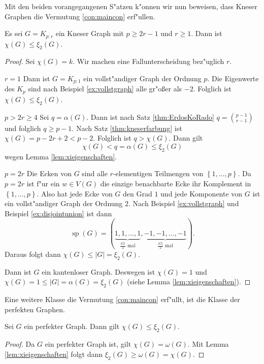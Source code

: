 Mit den beiden vorangegangenen S"atzen k"onnen wir nun beweisen, dass Kneser Graphen die Vermutung \ref{con:maincon} erf"ullen.
\begin{proposition}
  Es sei $G=K_{p:r}$ ein Kneser Graph mit $p\geq 2r-1$ und $r \geq 1$. Dann ist $\chi(G) \leq \xi_{2}(G)$. 
\end{proposition}
\begin{proof}
  Sei $\chi(G) = k$. Wir machen eine Fallunterscheidung bez"uglich $r$.

   {$r=1$} Dann ist $G=K_{p:1}$ ein vollst"andiger Graph der Ordnung $p$. Die Eigenwerte des $K_p$ sind nach Beispiel \ref{ex:vollstgraph} alle gr"o{\ss}er als $-2$. Folglich ist $\chi(G) \leq \xi_{2}(G)$. 

   {$p > 2r \geq 4 $} Sei $q = \alpha(G)$.  Dann ist nach Satz \ref{thm:ErdosKoRado} $ q = \binom{p-1}{r-1}$ und folglich $ q \geq p-1$. Nach Satz \ref{thm:kneserfarbung} ist $\chi(G) = p-2r+2 < p-2$. Folglich ist $q > \chi(G)$. 
  Dann gilt $$\chi(G) < q = \alpha(G) \leq \xi_{2}(G) $$ wegen Lemma \ref{lem:xieigenschaften}.

   {$ p = 2r $} Die Ecken von $G$ sind alle $r$-elementigen Teilmengen von $\left\{ 1,\dots,p \right\}$. Da $p=2r$ ist f"ur ein $w\in V(G)$ die einzige benachbarte Ecke ihr Komplement in $\left\{ 1,\dots,p \right\}$. 
  Also hat jede Ecke von $G$ den Grad $1$ und jede Komponente von $G$ ist ein vollst"andiger Graph der Ordnung $2$.
  Nach Beispiel \ref{ex:vollstgraph} und Beispiel \ref{ex:disjointunion} ist dann 
  $$\operatorname{sp} (G) = (\underbrace{1,1,\dots,1}_{\frac{|G|}{2} \text{ mal}} , \underbrace{-1,-1,\dots,-1}_{\frac{|G|}{2} \text{ mal}}). $$
  Daraus folgt dann $\chi(G) \leq |G| = \xi_{2}(G)$.

   Dann ist $G$ ein kantenloser Graph. Deswegen ist $\chi(G) = 1$ und $\chi(G) = 1 \leq |G| = \alpha(G) = \xi_{2}(G)$ (siehe Lemma \ref{lem:xieigenschaften}).
\end{proof}
Eine weitere Klasse die Vermutung \ref{con:maincon} erf"ullt, ist die Klasse der perfekten Graphen.

\begin{proposition}
  Sei $G$ ein perfekter Graph. Dann gilt 
  $\chi(G) \leq \xi_{2}(G)$.
\end{proposition}

\begin{proof}
  Da $G$ ein perfekter Graph ist, gilt $\chi(G) = \omega(G)$. 
  Mit Lemma \ref{lem:xieigenschaften} folgt dann $\xi_2(G) \geq \omega(G) = \chi(G)$.
\end{proof}

